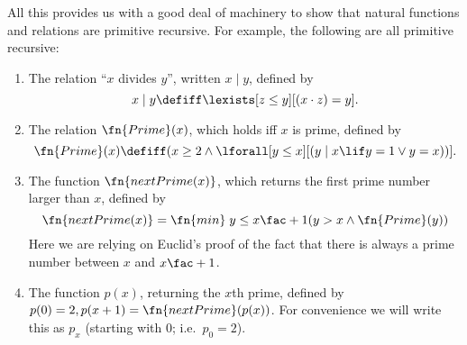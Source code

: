 \documentclass[../../include/open-logic-section]{subfiles}
\begin{document}
All this provides us with a good deal of machinery to show that
natural functions and relations are primitive recursive. For example,
the following are all primitive recursive:
\begin{enumerate}
\item The relation ``$x$ divides $y$'', written $x \mid y$, defined by
\[
x \mid y \defiff \lexists[z \leq y][(x \cdot z) = y].
\]

\item The relation $\fn{Prime}(x)$, which holds iff $x$ is prime,
  defined by
\[
\fn{Prime}(x) \defiff (x \geq 2 \land \lforall[y \leq x][(y \mid x \lif y
  = 1 \lor y = x))].
\]
\item The function $\fn{nextPrime(x)}$, which returns the first prime
  number larger than $x$, defined by
\[
  \fn{nextPrime(x)} = \fn{min} \; {y \leq x\fac+1} \\ (y > x \land \fn{Prime}(y))
\]
Here we are relying on Euclid's proof of the fact that there is always
a prime number between $x$ and $x\fac+1$.

\item The function $p(x)$, returning the $x$th prime, defined by $p(0)
  = 2, p(x+1) = \fn{nextPrime}(p(x))$. For convenience we will write
  this as $p_x$ (starting with 0; i.e.\ $p_0=2$).
\end{enumerate}
\end{document}
